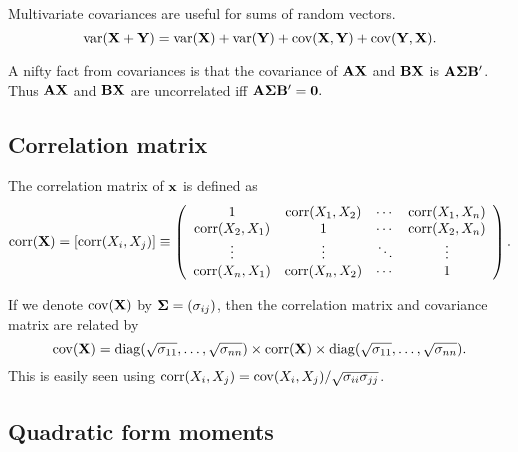 Multivariate covariances are useful for sums of random vectors. 
$$
\mathrm{var}(\mathbf{X} + \mathbf{Y}) = \mathrm{var}(\mathbf{X}) + \mathrm{var}(\mathbf{Y}) + \mathrm{cov}(\mathbf{X}, \mathbf{Y}) + \mathrm{cov}(\mathbf{Y}, \mathbf{X}).
$$

A nifty fact from covariances is that the covariance of $\mathbf{A} \mathbf{X}$ and
$\mathbf{B} \mathbf{X}$ is $\mathbf{A} \boldsymbol{\Sigma} \mathbf{B}'$. Thus $\mathbf{A} \mathbf{X}$ and $\mathbf{B} \mathbf{X}$ 
are uncorrelated iff $\mathbf{A} \boldsymbol{\Sigma} \mathbf{B}' = \mathbf{0}.$


\subsection{Correlation matrix}

The correlation matrix of $\mathbf{x}$ is defined as
\begin{eqnarray*}
\mathrm{corr}(\mathbf{X})=[\mathrm{corr}(X_i,X_j)]
\equiv
\left(\begin{array}{cccc}
	1&\mathrm{corr}(X_1,X_2)&\cdots&\mathrm{corr}(X_1,X_n)\\
	\mathrm{corr}(X_2,X_1)&1&\cdots&\mathrm{corr}(X_2,X_n)\\
	\vdots&\vdots&\ddots&\vdots\\
	\mathrm{corr}(X_n,X_1)&\mathrm{corr}(X_n,X_2)&\cdots&1\\
\end{array}\right).
\end{eqnarray*}

If we denote $\mathrm{cov}(\mathbf{X})$ by $\mathbf{\Sigma}=(\sigma_{ij})$, then the correlation
matrix and covariance matrix are related by
$$ \mathrm{cov}(\mathbf{X})=
\mathrm{diag}(\sqrt{\sigma_{11}},\ldots,\sqrt{\sigma_{nn}} )
\times \mathrm{corr}(\mathbf{X}) \times
\mathrm{diag}(\sqrt{\sigma_{11}},\ldots,\sqrt{\sigma_{nn}} ).
$$
This is easily seen using $\mathrm{corr}(X_i,X_j) =
\mathrm{cov}(X_i,X_j)/\sqrt{\sigma_{ii}\sigma_{jj}}$.



\subsection{Quadratic form moments}



%
%


